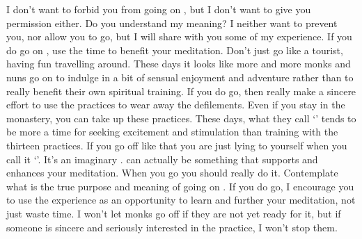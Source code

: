 I don't want to forbid you from going on , but I don't want to give you permission either. Do you understand my meaning? I neither want to prevent you, nor allow you to go, but I will share with you some of my experience. If you do go on , use the time to benefit your meditation. Don't just go like a tourist, having fun travelling around. These days it looks like more and more monks and nuns go on  to indulge in a bit of sensual enjoyment and adventure rather than to really benefit their own spiritual training. If you do go, then really make a sincere effort to use the  practices to wear away the defilements. Even if you stay in the monastery, you can take up these  practices. These days, what they call `' tends to be more a time for seeking excitement and stimulation than training with the thirteen  practices. If you go off like that you are just lying to yourself when you call it `'. It's an imaginary .  can actually be something that supports and enhances your meditation. When you go you should really do it. Contemplate what is the true purpose and meaning of going on . If you do go, I encourage you to use the experience as an opportunity to learn and further your meditation, not just waste time. I won't let monks go off if they are not yet ready for it, but if someone is sincere and seriously interested in the practice, I won't stop them.

